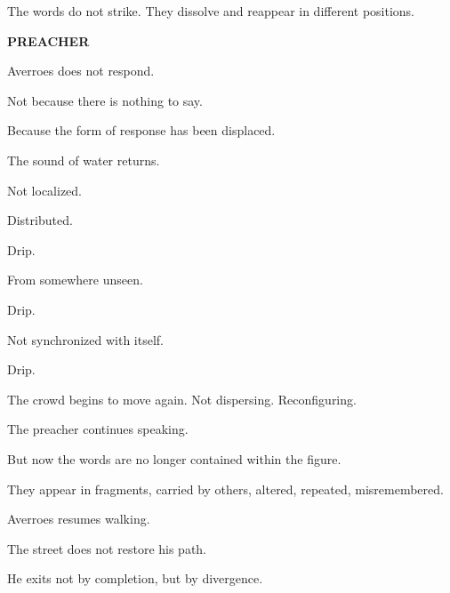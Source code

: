 The words do not strike. They dissolve and reappear in different positions.

\medskip

\textbf{PREACHER}


\medskip

Averroes does not respond.

Not because there is nothing to say.

Because the form of response has been displaced.

\medskip

The sound of water returns.

Not localized.

Distributed.

\medskip

Drip.

\medskip

From somewhere unseen.

\medskip

Drip.

\medskip

Not synchronized with itself.

\medskip

Drip.

\medskip

The crowd begins to move again. Not dispersing. Reconfiguring.

The preacher continues speaking.

But now the words are no longer contained within the figure.

They appear in fragments, carried by others, altered, repeated,
misremembered.

\medskip


\medskip


\medskip


\medskip

Averroes resumes walking.

The street does not restore his path.

He exits not by completion, but by divergence.
